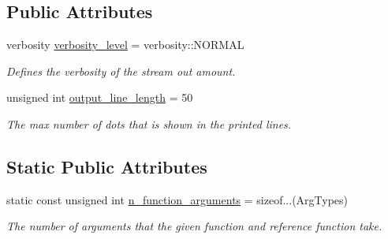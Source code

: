 \subsection*{Public Attributes}
\begin{DoxyCompactItemize}
\item 
verbosity \hyperlink{classunittest_1_1_randomized_function_test_a989821ad8636b95760dce271e6cc6c0c}{verbosity\+\_\+level} = verbosity\+::\+N\+O\+R\+M\+AL\hypertarget{classunittest_1_1_randomized_function_test_a989821ad8636b95760dce271e6cc6c0c}{}\label{classunittest_1_1_randomized_function_test_a989821ad8636b95760dce271e6cc6c0c}

\begin{DoxyCompactList}\small\item\em Defines the verbosity of the stream out amount. \end{DoxyCompactList}\item 
unsigned int \hyperlink{classunittest_1_1_randomized_function_test_a4e422a17416b736809c4b7407af8e89c}{output\+\_\+line\+\_\+length} = 50\hypertarget{classunittest_1_1_randomized_function_test_a4e422a17416b736809c4b7407af8e89c}{}\label{classunittest_1_1_randomized_function_test_a4e422a17416b736809c4b7407af8e89c}

\begin{DoxyCompactList}\small\item\em The max number of dots that is shown in the printed lines. \end{DoxyCompactList}\end{DoxyCompactItemize}
\subsection*{Static Public Attributes}
\begin{DoxyCompactItemize}
\item 
static const unsigned int \hyperlink{classunittest_1_1_randomized_function_test_a7b4e3d7e06313af5c9e2b107d4f78077}{n\+\_\+function\+\_\+arguments} = sizeof...(Arg\+Types)\hypertarget{classunittest_1_1_randomized_function_test_a7b4e3d7e06313af5c9e2b107d4f78077}{}\label{classunittest_1_1_randomized_function_test_a7b4e3d7e06313af5c9e2b107d4f78077}

\begin{DoxyCompactList}\small\item\em The number of arguments that the given function and reference function take. \end{DoxyCompactList}\end{DoxyCompactItemize}
